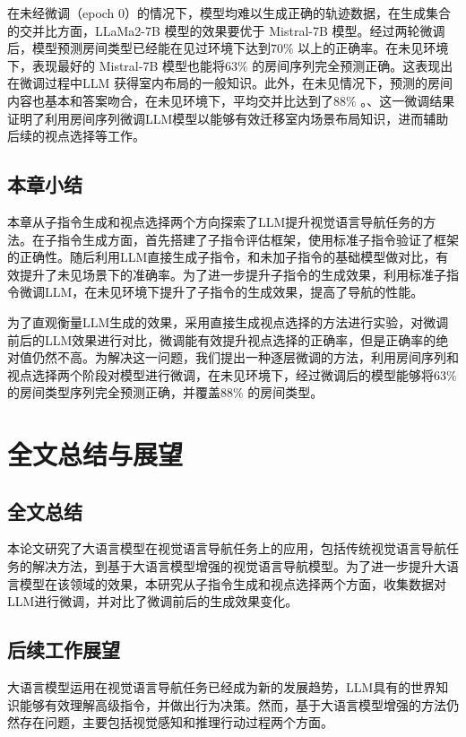 \documentclass[bachelor]{thesis-uestc}
\begin{document}
在未经微调（epoch 0）的情况下，模型均难以生成正确的轨迹数据，在生成集合的交并比方面，LLaMa2-7B 模型的效果要优于 Mistral-7B 模型。经过两轮微调后，模型预测房间类型已经能在见过环境下达到$70\%$ 以上的正确率。在未见环境下，表现最好的 Mistral-7B 模型也能将$63\%$ 的房间序列完全预测正确。这表现出在微调过程中LLM 获得室内布局的一般知识。此外，在未见情况下，预测的房间内容也基本和答案吻合，在未见环境下，平均交并比达到了$88\%$  。、这一微调结果证明了利用房间序列微调LLM模型以能够有效迁移室内场景布局知识，进而辅助后续的视点选择等工作。

\section{本章小结}

本章从子指令生成和视点选择两个方向探索了LLM提升视觉语言导航任务的方法。在子指令生成方面，首先搭建了子指令评估框架，使用标准子指令验证了框架的正确性。随后利用LLM直接生成子指令，和未加子指令的基础模型做对比，有效提升了未见场景下的准确率。为了进一步提升子指令的生成效果，利用标准子指令微调LLM，在未见环境下提升了子指令的生成效果，提高了导航的性能。

为了直观衡量LLM生成的效果，采用直接生成视点选择的方法进行实验，对微调前后的LLM效果进行对比，微调能有效提升视点选择的正确率，但是正确率的绝对值仍然不高。为解决这一问题，我们提出一种逐层微调的方法，利用房间序列和视点选择两个阶段对模型进行微调，在未见环境下，经过微调后的模型能够将$63\%$ 的房间类型序列完全预测正确，并覆盖$88\%$ 的房间类型。

\chapter{全文总结与展望}

\section{全文总结}
本论文研究了大语言模型在视觉语言导航任务上的应用，包括传统视觉语言导航任务的解决方法，到基于大语言模型增强的视觉语言导航模型。为了进一步提升大语言模型在该领域的效果，本研究从子指令生成和视点选择两个方面，收集数据对LLM进行微调，并对比了微调前后的生成效果变化。

\section{后续工作展望}

大语言模型运用在视觉语言导航任务已经成为新的发展趋势，LLM具有的世界知识能够有效理解高级指令，并做出行为决策。然而，基于大语言模型增强的方法仍然存在问题，主要包括视觉感知和推理行动过程两个方面。
\end{document}
